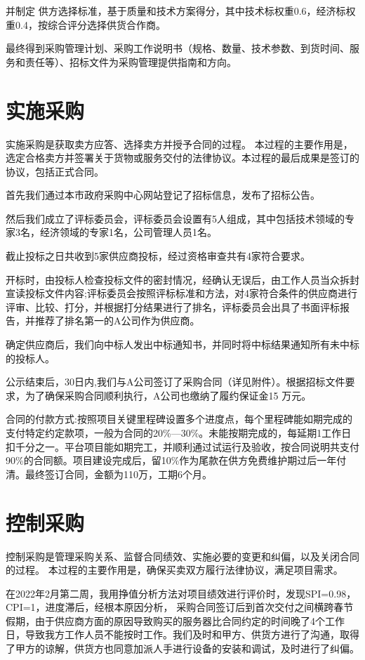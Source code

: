 \documentclass[UTF8]{../computerUniverse}
\begin{document}
并制定
供方选择标准，基于质量和技术方案得分，其中技术标权重0.6，经济标权重0.4，按综合评分选择供货合作商。

最终得到采购管理计划、采购工作说明书（规格、数量、技术参数、到货时间、服务和责任等）、招标文件为采购管理提供指南和方向。


\section{实施采购}

实施采购是获取卖方应答、选择卖方并授予合同的过程。
本过程的主要作用是，选定合格卖方并签署关于货物或服务交付的法律协议。本过程的最后成果是签订的协议，包括正式合同。


首先我们通过本市政府采购中心网站登记了招标信息，发布了招标公告。

然后我们成立了评标委员会，评标委员会设置有5人组成，其中包括技术领域的专家3名，经济领域的专家1名，公司管理人员1名。

截止投标之日共收到5家供应商投标，经过资格审查共有4家符合要求。

开标时，由投标人检查投标文件的密封情况，经确认无误后，由工作人员当众拆封宣读投标文件内容;评标委员会按照评标标准和方法，对4家符合条件的供应商进行评审、比较、打分，并根据打分结果进行了排名，评标委员会出具了书面评标报告，并推荐了排名第一的A公司作为供应商。

确定供应商后，我们向中标人发出中标通知书，并同时将中标结果通知所有未中标的投标人。

公示结束后，30日内,我们与A公司签订了采购合同（详见附件）。根据招标文件要求，为了确保采购合同顺利执行，A公司也缴纳了履约保证金15 万元。

合同的付款方式:按照项目关键里程碑设置多个进度点，每个里程碑能如期完成的支付特定约定款项，一般为合同的20\%—30\%。未能按期完成的，每延期1工作日扣千分之一。平台项目能如期完工，并顺利通过试运行及验收，按合同说明共支付90\%的合同额。项目建设完成后，留10\%作为尾款在供方免费维护期过后一年付清。最终签订合同，金额为110万，工期6个月。


\section{控制采购}

控制采购是管理采购关系、监督合同绩效、实施必要的变更和纠偏，以及关闭合同的过程。
本过程的主要作用是，确保买卖双方履行法律协议，满足项目需求。


在2022年2月第二周，我用挣值分析方法对项目绩效进行评价时，发现SPI=0.98，CPI=1，进度滞后，经根本原因分析，
采购合同签订后到首次交付之间横跨春节假期，由于供应商方面的原因导致购买的服务器比合同约定的时间晚了4个工作日，导致我方工作人员不能按时工作。我们及时和甲方、供货方进行了沟通，取得了甲方的谅解，供货方也同意加派人手进行设备的安装和调试，及时进行了纠偏。
\end{document}
